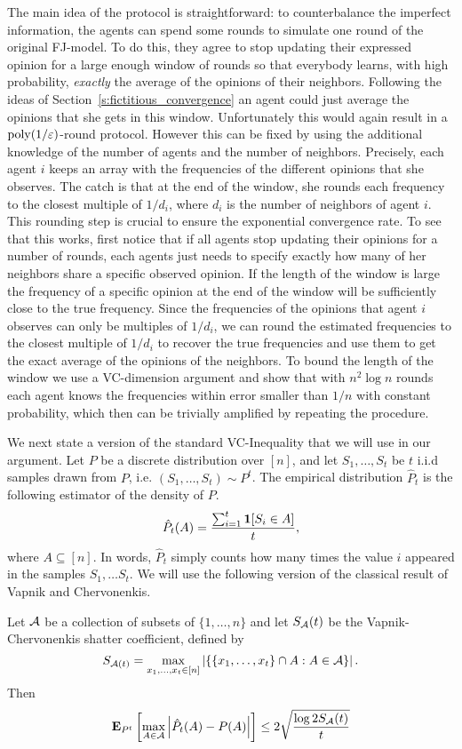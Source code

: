 The main idea of the protocol is straightforward: to counterbalance the
imperfect information, the agents can spend some rounds to simulate one round
of the original FJ-model. To do this, they agree to stop updating their
expressed opinion for a large enough window of rounds so that everybody learns,
with high probability, \emph{exactly} the average of the opinions of their
neighbors.  Following the ideas of Section~\ref{s:fictitious_convergence} an
agent could just average the opinions that she gets in this window.
Unfortunately this would again result in a $\mathrm{poly}(1/\varepsilon)$-round protocol.
However this can be fixed by using the additional knowledge of the number
of agents and the number of neighbors. Precisely, each agent
$i$ keeps an array with the frequencies of the different opinions that she
observes. The catch is that at the end of the window, she rounds each frequency
to the closest multiple of $1/d_i$, where $d_i$ is the number of neighbors of
agent $i$. This rounding step is crucial to ensure the exponential convergence
rate. To see that this works, first notice that if all agents stop updating
their opinions for a number of rounds, each agents just needs to specify
exactly how many of her neighbors share a specific observed opinion.
If the length of the window is large the frequency of
a specific opinion at the end of the window will be sufficiently
close to the true frequency.  Since the frequencies of
the opinions that agent $i$ observes can only be multiples of $1/d_i$,
we can round the estimated frequencies to the closest multiple of $1/d_i$ to
recover the true frequencies and use them to get the exact average of the
opinions of the neighbors.  To bound the length of the window we use a
VC-dimension argument and show that with $n^2 \log n$ rounds each agent
knows the frequencies within error smaller than $1/n$ with constant
probability, which then can be trivially amplified by repeating the procedure.

We next state a version of the standard VC-Inequality that we will use
in our argument.  Let $P$ be a discrete distribution over $[n]$, and let
$S_1, \ldots, S_t$ be $t$ i.i.d samples drawn from $P$, i.e.
$(S_1, \ldots, S_t) \sim P^t$.  The empirical distribution $\hat{P}_t$ is the
following estimator of the density of $P$.
\begin{equation}\label{eq:empirical_distribution}
  \hat{P}_t(A) = \frac{\sum_{i=1}^t \bm{1}{\left[S_i \in A\right]}}{t},
\end{equation}
where $A \subseteq [n]$. In words, $\hat{P}_t$ simply counts
how many times the value $i$ appeared in the samples $S_1, \ldots S_t$.
We will use the following version of the classical result of Vapnik and
Chervonenkis.
\begin{lemma}\label{l:vc_inequality}
  Let $\mathcal{A}$ be a collection of subsets of $\{1,\ldots, n\}$ and let
  $S_{\mathcal{A}}(t)$ be the Vapnik-Chervonenkis shatter coefficient, defined
  by
  \[
    S_{\mathcal{A}(t)} = \max_{x_1,\ldots, x_t \in [n]}
    \left| \{ \{x_1, \ldots, x_t\} \cap A : A \in \mathcal{A} \} \right|.
  \]
  Then
  \[
    \bm{\mathrm{E}}_{P^t} \left[ \max_{A \in \mathcal{A}} \left| \hat{P}_t(A) - P(A) \right| \right]
    \leq 2 \sqrt{\frac{\log{2 S_{\mathcal{A}}(t)}}{t}}
  \]
\end{lemma}

